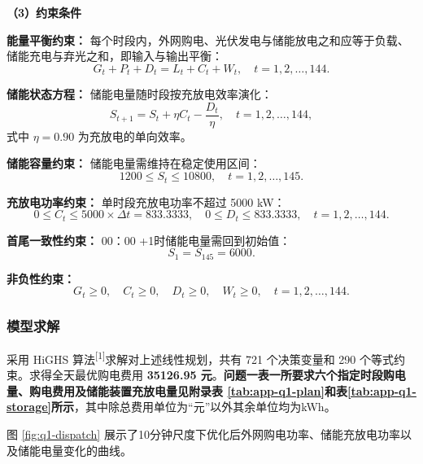 \documentclass[withoutpreface,bwprint]{cumcmthesis} %
\begin{document}
\textbf{（3）约束条件}

\quad \textbf{能量平衡约束：} 每个时段内，外网购电、光伏发电与储能放电之和应等于负载、储能充电与弃光之和，即输入与输出平衡：
\begin{equation}
G_t+P_t+D_t=L_t+C_t+W_t,\quad t=1,2,\ldots,144.
\label{eq:q1-balance}
\end{equation}

\quad \textbf{储能状态方程：} 储能电量随时段按充放电效率演化：
\begin{equation}
S_{t+1}=S_t+\eta C_t-\frac{D_t}{\eta},\quad t=1,2,\ldots,144,
\label{eq:q1-soc}
\end{equation}
式中 $\eta=0.90$ 为充放电的单向效率。

\quad \textbf{储能容量约束：} 储能电量需维持在稳定使用区间：
\begin{equation}
1200\leq S_t\leq 10800,\quad t=1,2,\ldots,145.
\label{eq:q1-capacity}
\end{equation}

\quad \textbf{充放电功率约束：} 单时段充放电功率不超过 5000 kW：
\begin{equation}
0\leq C_t\leq 5000\times\Delta t=833.3333,\quad
0\leq D_t\leq 833.3333,\quad t=1,2,\ldots,144.
\label{eq:q1-power}
\end{equation}

\quad \textbf{首尾一致性约束：} 00：00 +1时储能电量需回到初始值：
\begin{equation}
S_1=S_{145}=6000.
\label{eq:q1-terminal}
\end{equation}

\quad \textbf{非负性约束：}
\begin{equation}
G_t\geq 0,\quad C_t\geq 0,\quad D_t\geq 0,\quad W_t\geq 0,\quad t=1,2,\ldots,144.
\label{eq:q1-nonnegative}
\end{equation}


\subsubsection{模型求解}

采用 HiGHS 算法\textsuperscript{[1]}求解对上述线性规划，共有 721 个决策变量和 290 个等式约束。求得全天最优购电费用 \textbf{35126.95 元}。\textbf{问题一表一所要求六个指定时段购电量、购电费用及储能装置充放电量见附录表 \ref{tab:app-q1-plan}和表\ref{tab:app-q1-storage}所示}，其中除总费用单位为“元”以外其余单位均为kWh。

图 \ref{fig:q1-dispatch} 展示了10分钟尺度下优化后外网购电功率、储能充放电功率以及储能电量变化的曲线。
\end{document}
